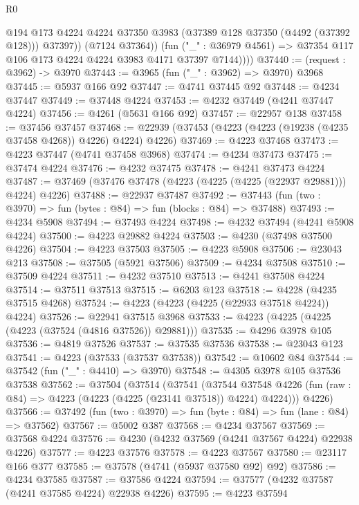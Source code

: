 \begin{lexlean}{R0}
\begin{coremodule}
                @194
                @173
                @4224
                @4224
                @37350
                @3983
                (@37389 @128 @37350 (@4492 (@37392 @128)))
                @37397))
            (@7124 @37364))
          (fun ("_" : @36979 @4561) =>
          @37354 @117 @106 @173 @4224 @4224 @3983 @4171 @37397 @7144))))
@37440 := (request : @3962) -> @3970
@37443 := @3965 (fun ("_" : @3962) => @3970) @3968
@37445 := @5937 @166 @92
@37447 := @4741 @37445 @92
@37448 := @4234 @37447
@37449 := @37448 @4224
@37453 := @4232 @37449 (@4241 @37447 @4224)
@37456 := @4261 (@5631 @166 @92)
@37457 := @22957 @138
@37458 := @37456 @37457
@37468 := @22939 (@37453 (@4223 (@4223 (@19238 (@4235 @37458 @4268)) @4226) @4224) @4226)
@37469 := @4223 @37468
@37473 := @4223 @37447 (@4741 @37458 @3968)
@37474 := @4234 @37473
@37475 := @37474 @4224
@37476 := @4232 @37475
@37478 := @4241 @37473 @4224
@37487 := @37469 (@37476 @37478 (@4223 (@4225 (@4225 (@22937 @29881))) @4224) @4226)
@37488 := @22937 @37487
@37492 := @37443 (fun (two : @3970) => fun (bytes : @84) => fun (blocks : @84) => @37488)
@37493 := @4234 @5908
@37494 := @37493 @4224
@37498 := @4232 @37494 (@4241 @5908 @4224)
@37500 := @4223 @29882 @4224
@37503 := @4230 (@37498 @37500 @4226)
@37504 := @4223 @37503
@37505 := @4223 @5908
@37506 := @23043 @213
@37508 := @37505 (@5921 @37506)
@37509 := @4234 @37508
@37510 := @37509 @4224
@37511 := @4232 @37510
@37513 := @4241 @37508 @4224
@37514 := @37511 @37513
@37515 := @6203 @123
@37518 := @4228 (@4235 @37515 @4268)
@37524 := @4223 (@4223 (@4225 (@22933 @37518 @4224)) @4224)
@37526 := @22941 @37515 @3968
@37533 := @4223 (@4225 (@4225 (@4223 (@37524 (@4816 @37526)) @29881)))
@37535 := @4296 @3978 @105
@37536 := @4819 @37526
@37537 := @37535 @37536
@37538 := @23043 @123
@37541 := @4223 (@37533 (@37537 @37538))
@37542 := @10602 @84
@37544 := @37542 (fun ("_" : @4410) => @3970)
@37548 := @4305 @3978 @105 @37536 @37538
@37562 := @37504
    (@37514
      (@37541
        (@37544
          @37548
          @4226
          (fun (raw : @84) => @4223 (@4223 (@4225 (@23141 @37518)) @4224) @4224)))
      @4226)
@37566 := @37492 (fun (two : @3970) => fun (byte : @84) => fun (lane : @84) => @37562)
@37567 := @5002 @387
@37568 := @4234 @37567
@37569 := @37568 @4224
@37576 := @4230 (@4232 @37569 (@4241 @37567 @4224) @22938 @4226)
@37577 := @4223 @37576
@37578 := @4223 @37567
@37580 := @23117 @166 @377
@37585 := @37578 (@4741 (@5937 @37580 @92) @92)
@37586 := @4234 @37585
@37587 := @37586 @4224
@37594 := @37577 (@4232 @37587 (@4241 @37585 @4224) @22938 @4226)
@37595 := @4223 @37594

\end{coremodule}
\end{lexlean}
